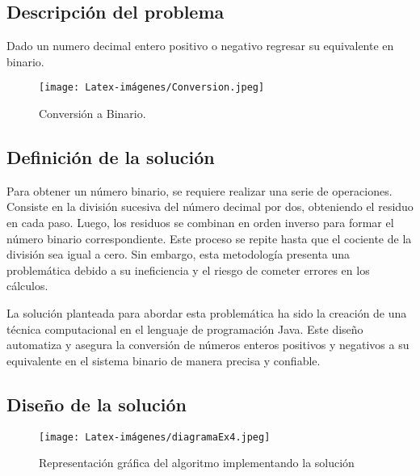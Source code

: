 
\subsection{Descripción del problema}
Dado un numero decimal entero positivo o negativo regresar su equivalente en binario.

\begin {figure}[h!]
\centerline{\texttt{[image: Latex-imágenes/Conversion.jpeg]}}
\caption{Conversión a Binario.}
\label{fig}
\end {figure}

\subsection{Definición de la solución}
Para obtener un número binario, se requiere realizar una serie de operaciones. Consiste en la división sucesiva del número decimal por dos, obteniendo el residuo en cada paso. Luego, los residuos se combinan en orden inverso para formar el número binario correspondiente. Este proceso se repite hasta que el cociente de la división sea igual a cero. Sin embargo, esta metodología presenta una problemática debido a su ineficiencia y el riesgo de cometer errores en los cálculos.

La solución planteada para abordar esta problemática ha sido la creación de una técnica computacional en el lenguaje de programación Java. Este diseño automatiza y asegura la conversión de números enteros positivos y negativos a su equivalente en el sistema binario de manera precisa y confiable. 

\subsection{Diseño de la solución}
\begin {figure}[htb]
\centerline{\texttt{[image: Latex-imágenes/diagramaEx4.jpeg]}}
\caption{Representación gráfica del algoritmo implementando la solución}
\label{fig}
\end {figure}


